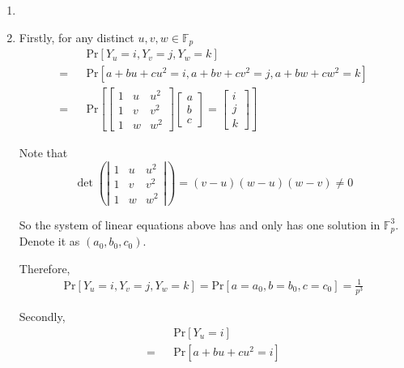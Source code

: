 \documentclass[12pt,a4]{article}
\newcounter{exercise}
\begin{document}
\begin{exercise}
	\begin{enumerate}
		\item
		\item
		
			Firstly, for any distinct $u, v, w \in \mathbb{F}_{p}$
			\begin{eqnarray*}
				&&\text{Pr}[Y_u = i, Y_v = j, Y_w = k] \\
				= &&\text{Pr}[a + bu + cu^2 = i, a + bv + cv^2 = j, a + bw + cw^2 = k] \\
				= &&\text{Pr}[
				\left[
				\begin{matrix}
					1 & u & u^2 \\
					1 & v & v^2 \\
					1 & w & w^2
				\end{matrix}
				\right]
				\left[
				\begin{matrix}
					a \\
					b \\
					c
				\end{matrix}
				\right]
				=
				\left[
				\begin{matrix}
					i \\
					j \\
					k
				\end{matrix}
				\right]
				]
			\end{eqnarray*}
			
			Note that
			\[
				\det
				\left(\left|
				\begin{matrix}
					1 & u & u^2 \\
					1 & v & v^2 \\
					1 & w & w^2
				\end{matrix}
				\right|\right)
				=
				(v - u)(w - u)(w - v)
				\neq
				0
			\]
			
			So the system of linear equations above has and only has one solution in $\mathbb{F}^{3}_{p}$.
			Denote it as $(a_0, b_0, c_0)$.
			
			Therefore,
			\begin{eqnarray*}
				\text{Pr}[Y_u = i, Y_v = j, Y_w = k]
				= \text{Pr}[a = a_0, b = b_0, c = c_0]
				= \frac{1}{p^3}
			\end{eqnarray*}
			
			Secondly,
			\begin{eqnarray*}
				&&\text{Pr}[Y_u = i] \\
				= &&\text{Pr}[a + bu + cu^2 = i]
			\end{eqnarray*}
			

\end{enumerate}
\end{exercise}
\end{document}
